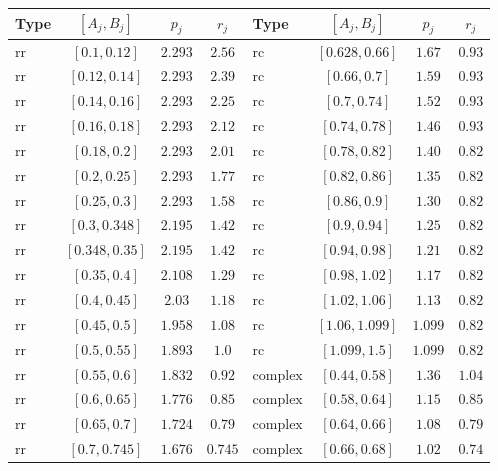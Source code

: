 \documentclass[11pt]{amsart}
\numberwithin{equation}{section}
\theoremstyle{plain}
\theoremstyle{definition}
\theoremstyle{remark}
\newcommand{\1}{\mathbf{1}}
\begin{document}
\begin{table}[tp]
\centering
\small
\begin{tabular}{@{}lccc@{\qquad\qquad}lccc@{}}
\toprule
Type & $[A_j,B_j]$ & $p_j$ & $r_j$ & Type & $[A_j,B_j]$ & $p_j$ & $r_j$\\
\midrule
$\mathrm{rr}$ & $[0.1,0.12]$ & $2.293$ & $2.56$ & $\mathrm{rc}$ & $[0.628,0.66]$ & $1.67$ & $0.93$ \\
$\mathrm{rr}$ & $[0.12,0.14]$ & $2.293$ & $2.39$ & $\mathrm{rc}$ & $[0.66,0.7]$ & $1.59$ & $0.93$ \\
$\mathrm{rr}$ & $[0.14,0.16]$ & $2.293$ & $2.25$ & $\mathrm{rc}$ & $[0.7,0.74]$ & $1.52$ & $0.93$ \\
$\mathrm{rr}$ & $[0.16,0.18]$ & $2.293$ & $2.12$ & $\mathrm{rc}$ & $[0.74,0.78]$ & $1.46$ & $0.93$ \\
$\mathrm{rr}$ & $[0.18,0.2]$ & $2.293$ & $2.01$ & $\mathrm{rc}$ & $[0.78,0.82]$ & $1.40$ & $0.82$ \\
$\mathrm{rr}$ & $[0.2,0.25]$ & $2.293$ & $1.77$ & $\mathrm{rc}$ & $[0.82,0.86]$ & $1.35$ & $0.82$ \\
$\mathrm{rr}$ & $[0.25,0.3]$ & $2.293$ & $1.58$ & $\mathrm{rc}$ & $[0.86,0.9]$ & $1.30$ & $0.82$ \\
$\mathrm{rr}$ & $[0.3,0.348]$ & $2.195$ & $1.42$ & $\mathrm{rc}$ & $[0.9,0.94]$ & $1.25$ & $0.82$ \\
$\mathrm{rr}$ & $[0.348,0.35]$ & $2.195$ & $1.42$ & $\mathrm{rc}$ & $[0.94,0.98]$ & $1.21$ & $0.82$ \\
$\mathrm{rr}$ & $[0.35,0.4]$ & $2.108$ & $1.29$ & $\mathrm{rc}$ & $[0.98,1.02]$ & $1.17$ & $0.82$ \\
$\mathrm{rr}$ & $[0.4,0.45]$ & $2.03$ & $1.18$ & $\mathrm{rc}$ & $[1.02,1.06]$ & $1.13$ & $0.82$ \\
$\mathrm{rr}$ & $[0.45,0.5]$ & $1.958$ & $1.08$ & $\mathrm{rc}$ & $[1.06,1.099]$ & $1.099$ & $0.82$ \\
$\mathrm{rr}$ & $[0.5,0.55]$ & $1.893$ & $1.0$ & $\mathrm{rc}$ & $[1.099,1.5]$ & $1.099$ & $0.82$ \\
$\mathrm{rr}$ & $[0.55,0.6]$ & $1.832$ & $0.92$ & $\mathrm{complex}$ & $[0.44,0.58]$ & $1.36$ & $1.04$ \\
$\mathrm{rr}$ & $[0.6,0.65]$ & $1.776$ & $0.85$ & $\mathrm{complex}$ & $[0.58,0.64]$ & $1.15$ & $0.85$ \\
$\mathrm{rr}$ & $[0.65,0.7]$ & $1.724$ & $0.79$ & $\mathrm{complex}$ & $[0.64,0.66]$ & $1.08$ & $0.79$ \\
$\mathrm{rr}$ & $[0.7,0.745]$ & $1.676$ & $0.745$ & $\mathrm{complex}$ & $[0.66,0.68]$ & $1.02$ & $0.74$ \\

\end{tabular}
\end{table}
\end{document}
